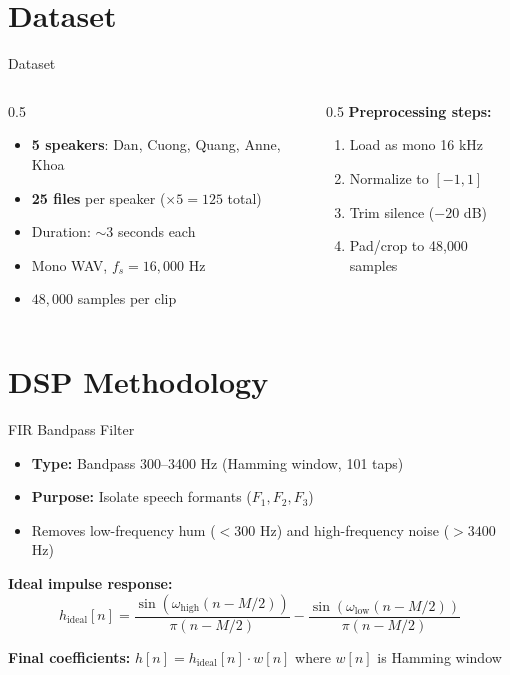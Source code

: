 \documentclass[aspectratio=169]{beamer}
\begin{document}
\section{Dataset}
\begin{frame}{Dataset}
\begin{columns}
\begin{column}{0.5\textwidth}
\begin{itemize}
    \item \textbf{5 speakers}: Dan, Cuong, Quang, Anne, Khoa
    \item \textbf{25 files} per speaker ($\times 5 = 125$ total)
    \item Duration: $\sim$3 seconds each
    \item Mono WAV, $f_s = 16{,}000$ Hz
    \item $48{,}000$ samples per clip
\end{itemize}
\end{column}
\begin{column}{0.5\textwidth}
\textbf{Preprocessing steps:}
\begin{enumerate}
    \item Load as mono 16 kHz
    \item Normalize to $[-1,1]$
    \item Trim silence ($-20$ dB)
    \item Pad/crop to 48{,}000 samples
\end{enumerate}
\end{column}
\end{columns}
\end{frame}

\section{DSP Methodology}
\begin{frame}{FIR Bandpass Filter}
\begin{itemize}
    \item \textbf{Type:} Bandpass 300--3400 Hz (Hamming window, 101 taps)
    \item \textbf{Purpose:} Isolate speech formants ($F_1, F_2, F_3$)
    \item Removes low-frequency hum ($<300$ Hz) and high-frequency noise ($>3400$ Hz)
\end{itemize}

\vspace{0.3cm}
\textbf{Ideal impulse response:}
$$h_{\text{ideal}}[n] = \frac{\sin(\omega_{\text{high}}(n - M/2))}{\pi(n - M/2)} - \frac{\sin(\omega_{\text{low}}(n - M/2))}{\pi(n - M/2)}$$

\textbf{Final coefficients:} $h[n] = h_{\text{ideal}}[n] \cdot w[n]$ where $w[n]$ is Hamming window
\end{frame}
\end{document}
